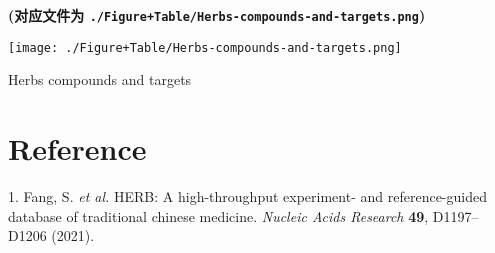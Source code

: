 \documentclass[
]{article}
\newenvironment{cslreferences}%
  {}%
  {\par}
\begin{document}
\textbf{(对应文件为 \texttt{./Figure+Table/Herbs-compounds-and-targets.png})}

\def\@captype{figure}
\begin{center}
\texttt{[image: ./Figure+Table/Herbs-compounds-and-targets.png]}
\caption{Herbs compounds and targets}\label{fig:Herbs-compounds-and-targets}
\end{center}

\hypertarget{bibliography}{%
\section*{Reference}\label{bibliography}}

\hypertarget{refs}{}
\begin{cslreferences}
\leavevmode\hypertarget{ref-HerbAHighThFang2021}{}%
1. Fang, S. \emph{et al.} HERB: A high-throughput experiment- and reference-guided database of traditional chinese medicine. \emph{Nucleic Acids Research} \textbf{49}, D1197--D1206 (2021).
\end{cslreferences}
\end{document}
